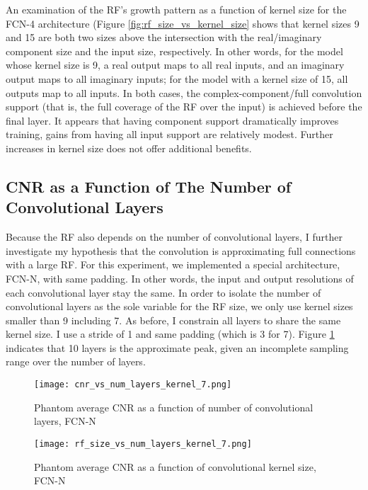 An examination of the RF's growth pattern as a function of kernel size for the FCN-4 architecture (Figure \ref{fig:rf_size_vs_kernel_size} shows that kernel sizes 9 and 15 are both two sizes above the intersection with the real/imaginary component size and the input size, respectively. In other words, for the model whose kernel size is 9, a real output maps to all real inputs, and an imaginary output maps to all imaginary inputs; for the model with a kernel size of 15, all outputs map to all inputs. In both cases, the complex-component/full convolution support (that is, the full coverage of the RF over the input) is achieved before the final layer. It appears that having component support dramatically improves training, gains from having all input support are relatively modest. Further increases in kernel size does not offer additional benefits.



\subsection{CNR as a Function of The Number of Convolutional Layers}
Because the RF also depends on the number of convolutional layers, I further investigate my hypothesis that the convolution is approximating full connections with a large RF. For this experiment, we implemented a special architecture, FCN-N, with same padding. In other words, the input and output resolutions of each convolutional layer stay the same. In order to isolate the number of convolutional layers as the sole variable for the RF size, we only use kernel sizes smaller than 9 including 7. As before, I constrain all layers to share the same kernel size. I use a stride of 1 and same padding (which is 3 for 7). Figure \ref{fig:cnr_vs_num_layers_kernel_7} indicates that 10 layers is the approximate peak, given an incomplete sampling range over the number of layers.

\begin{figure}[htbp]
  \centerline{\texttt{[image: cnr\_vs\_num\_layers\_kernel\_7.png]}}
  \caption{Phantom average CNR as a function of number of convolutional layers, FCN-N}
  \label{fig:cnr_vs_num_layers_kernel_7}
\end{figure}


\begin{figure}[htbp]
  \centerline{\texttt{[image: rf\_size\_vs\_num\_layers\_kernel\_7.png]}}
  \caption{Phantom average CNR as a function of convolutional kernel size, FCN-N}
  \label{fig:rf_size_vs_num_kernels_kernel_7}
\end{figure}

